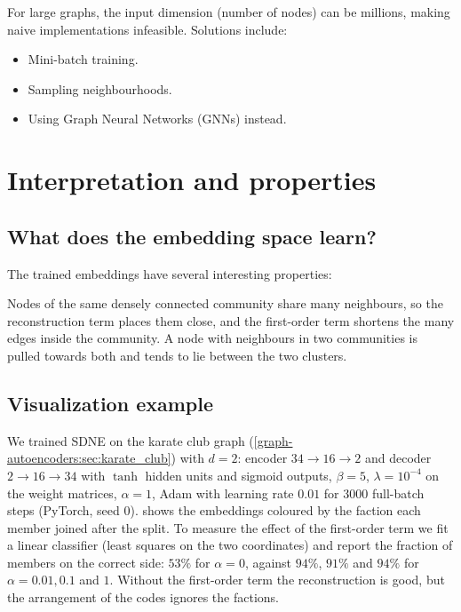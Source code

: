 \begin{notechapter}
For large graphs, the input dimension (number of nodes) can be millions, making naive implementations infeasible. Solutions include:
\begin{itemize}
    \item Mini-batch training.
    \item Sampling neighbourhoods.
    \item Using Graph Neural Networks (GNNs) instead.
\end{itemize}

\section{Interpretation and properties}

\subsection{What does the embedding space learn?}

The trained embeddings have several interesting properties:

\begin{intuition}
Nodes of the same densely connected community share many neighbours, so the reconstruction term places them close, and the first-order term shortens the many edges inside the community. A node with neighbours in two communities is pulled towards both and tends to lie between the two clusters.
\end{intuition}

\subsection{Visualization example}

We trained SDNE on the karate club graph (\cref{graph-autoencoders:sec:karate_club}) with $d = 2$: encoder $34 \to 16 \to 2$ and decoder $2 \to 16 \to 34$ with $\tanh$ hidden units and sigmoid outputs, $\beta = 5$, $\lambda = 10^{-4}$ on the weight matrices, $\alpha = 1$, Adam with learning rate $0.01$ for $3000$ full-batch steps (PyTorch, seed $0$).  shows the embeddings coloured by the faction each member joined after the split. To measure the effect of the first-order term we fit a linear classifier (least squares on the two coordinates) and report the fraction of members on the correct side: $53\%$ for $\alpha = 0$, against $94\%$, $91\%$ and $94\%$ for $\alpha = 0.01, 0.1$ and $1$. Without the first-order term the reconstruction is good, but the arrangement of the codes ignores the factions.


\end{notechapter}
